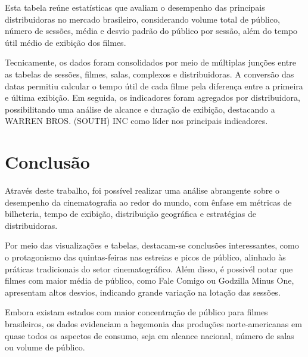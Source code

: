 \documentclass{article}
\begin{document}
Esta tabela reúne estatísticas que avaliam o desempenho das principais distribuidoras no mercado brasileiro, considerando volume total de público, número de sessões, média e desvio padrão do público por sessão, além do tempo útil médio de exibição dos filmes.

Tecnicamente, os dados foram consolidados por meio de múltiplas junções entre as tabelas de sessões, filmes, salas, complexos e distribuidoras. A conversão das datas permitiu calcular o tempo útil de cada filme pela diferença entre a primeira e última exibição. Em seguida, os indicadores foram agregados por distribuidora, possibilitando uma análise de alcance e duração de exibição, destacando a WARREN BROS. (SOUTH) INC como líder nos principais indicadores.


\section*{Conclusão}

Através deste trabalho, foi possível realizar uma análise abrangente sobre o desempenho da cinematografia ao redor do mundo, com ênfase em métricas de bilheteria, tempo de exibição, distribuição geográfica e estratégias de distribuidoras.

Por meio das visualizações e tabelas, destacam-se conclusões interessantes, como o protagonismo das quintas-feiras nas estreias e picos de público, alinhado às práticas tradicionais do setor cinematográfico. Além disso, é possivél notar que filmes com maior média de público, como Fale Comigo ou Godzilla Minus One, apresentam altos desvios, indicando grande variação na lotação das sessões.

Embora existam estados com maior concentração de público para filmes brasileiros, os dados evidenciam a hegemonia das produções norte-americanas em quase todos os aspectos de consumo, seja em alcance nacional, número de salas ou volume de público. 
\end{document}
